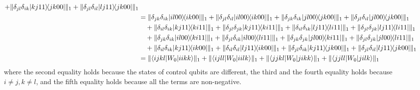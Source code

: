 \documentclass[a4paper,twocolumn,accepted=2022-10-23]{quantumarticle}
\newcommand{\bra}[1]{\langle {#1} \vert}
\newcommand{\ket}[1]{\vert {#1} \rangle}
\newcommand{\ketbra}[2]{\vert {#1} \rangle\!\langle {#2} \vert}
\theoremstyle{definition}
\begin{document}
\begin{align}
+ \| \delta_{jl}\delta_{ik} \ketbra{kj11}{jk00} \|_1 + \| \delta_{jl}\delta_{il} \ketbra{lj11}{jk00} \|_1 \\
%
&= \| \delta_{jk}\delta_{ik} \ketbra{il00}{ik00} \|_1 + \| \delta_{jl}\delta_{il} \ketbra{il00}{ik00} \|_1
+ \| \delta_{jk}\delta_{ik} \ketbra{jl00}{jk00} \|_1 + \| \delta_{jl}\delta_{il} \ketbra{jl00}{jk00} \|_1 \notag \\
&\quad + \| \delta_{il}\delta_{ik} \ketbra{kj11}{ki11} \|_1 + \| \delta_{jl}\delta_{jk} \ketbra{kj11}{ki11} \|_1
+ \| \delta_{il}\delta_{ik} \ketbra{lj11}{li11} \|_1 + \| \delta_{jl}\delta_{jk} \ketbra{lj11}{li11} \|_1 \notag \\
&\quad + \| \delta_{jk}\delta_{ik} \ketbra{il00}{ki11} \|_1 + \| \delta_{jl}\delta_{ik} \ketbra{il00}{li11} \|_1
+ \| \delta_{jk}\delta_{jk} \ketbra{jl00}{ki11} \|_1 + \| \delta_{jl}\delta_{jk} \ketbra{jl00}{li11} \|_1 \notag \\
&\quad + \| \delta_{il}\delta_{ik} \ketbra{kj11}{ik00} \|_1 + \| \delta_{il}\delta_{il} \ketbra{lj11}{ik00} \|_1
+ \| \delta_{jl}\delta_{ik} \ketbra{kj11}{jk00} \|_1 + \| \delta_{jl}\delta_{il} \ketbra{lj11}{jk00} \|_1 \\
%
&= \| \bra{ijkl} {W_0} \ket{iikk} \|_1 + \| \bra{ijll} {W_0} \ket{iilk} \|_1
 + \| \bra{jjkl} {W_0} \ket{jikk} \|_1 + \| \bra{jjll} {W_0} \ket{jilk} \|_1
\end{align}
where the second equality holds because the states of control qubits are different,
the third and the fourth equality holds because $i \neq j, k \neq l$,
and the fifth equality holds because all the terms are non-negative.
\end{document}
